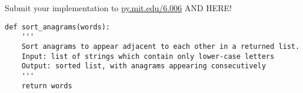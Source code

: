 \documentclass[12pt,twoside]{article}
\begin{document}


\begin{problems}

\problem  %

\begin{problemparts}
\problempart %
\problempart %
\end{problemparts}

\newpage
\problem  %

\begin{problemparts}
\problempart %
\problempart %
\problempart %
\problempart %
\end{problemparts}

\newpage
\problem  %

\begin{problemparts}
\problempart %
\problempart %

\newpage
\problempart Submit your implementation to {\small\url{py.mit.edu/6.006}} AND
HERE!

{\scriptsize
\begin{verbatim}
def sort_anagrams(words):
    '''
    Sort anagrams to appear adjacent to each other in a returned list.
    Input: list of strings which contain only lower-case letters
    Output: sorted list, with anagrams appearing consecutively
    '''
    return words
\end{verbatim}
}
\end{problemparts}

\end{problems}
\end{document}
